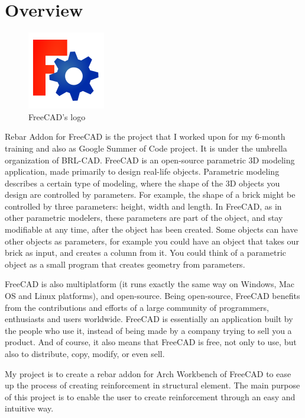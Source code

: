 \section{Overview}

\begin{figure}[H] 
	\centering \includegraphics[scale=1]{images/freecadlogo.png}
	\caption{FreeCAD's logo}
	\label{fig:freecadlogo}
\end{figure}


Rebar Addon for FreeCAD is the project that I worked upon for my 6-month training and also as Google Summer of Code project. It is under the umbrella organization of BRL-CAD. FreeCAD is an open-source parametric 3D modeling application, made primarily to design real-life objects. Parametric modeling describes a certain type of modeling, where the shape of the 3D objects you design are controlled by parameters. For example, the shape of a brick might be controlled by three parameters: height, width and length. In FreeCAD, as in other parametric modelers, these parameters are part of the object, and stay modifiable at any time, after the object has been created. Some objects can have other objects as parameters, for example you could have an object that takes our brick as input, and creates a column from it. You could think of a parametric object as a small program that creates geometry from parameters.

FreeCAD is also multiplatform (it runs exactly the same way on Windows, Mac OS and Linux platforms), and open-source. Being open-source, FreeCAD benefits from the contributions and efforts of a large community of programmers, enthusiasts and users worldwide. FreeCAD is essentially an application built by the people who use it, instead of being made by a company trying to sell you a product. And of course, it also means that FreeCAD is free, not only to use, but also to distribute, copy, modify, or even sell.

My project is to create a rebar addon for Arch Workbench of FreeCAD to ease up the process of creating reinforcement in structural element. The main purpose of this project is to enable the user to create reinforcement through an easy and intuitive way.

